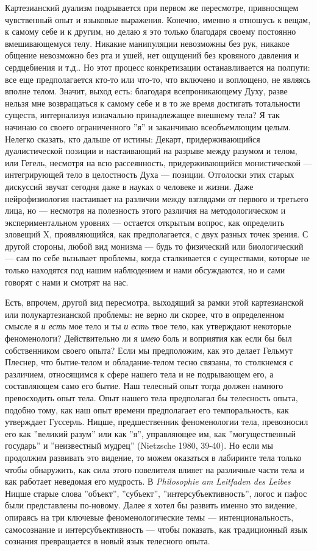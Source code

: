 \documentclass[12pt]{book}
\begin{document}
Картезианский дуализм подрывается при первом же пересмотре, привносящем чувственный опыт и языковые выражения. Конечно, именно я отношусь к вещам, к самому себе и к другим, но делаю я это только благодаря своему постоянно вмешивающемуся телу. Никакие манипуляции невозможны без рук, никакое общение невозможно без рта и ушей, нет ощущений без кровяного давления и сердцебиения и т.д.. Но этот процесс конкретизации останавливается на полпути: все еще предполагается кто-то или что-то, что включено и воплощено, не являясь вполне телом. Значит, выход есть: благодаря всепроникающему Духу, разве нельзя мне возвращаться к самому себе и в то же время достигать тотальности существ, интернализуя изначально принадлежащее внешнему тела? Я так начинаю со своего ограниченного ''я'' и заканчиваю всеобъемлющим целым. Нелегко сказать, кто дальше от истины: Декарт, придерживающийся дуалистической позиции и настаивающий на разрыве между разумом и телом, или Гегель, несмотря на всю рассеянность, придерживающийся монистической --- интегрирующей тело в целостность Духа --- позиции. Отголоски этих старых дискуссий звучат сегодня даже в науках о человеке и жизни. Даже нейрофизиология настаивает на различии между взглядами от первого и третьего лица, но --- несмотря на полезность этого различия на методологическом и экспериментальном уровнях --- остается открытым вопрос, как определить зловещий X, проявляющийся, как предполагается, с двух разных точек зрения. С другой стороны, любой вид монизма --- будь то физический или биологический --- сам по себе вызывает проблемы, когда сталкивается с существами, которые не только находятся под нашим наблюдением и нами обсуждаются, но и сами говорят с нами и смотрят на нас.

Есть, впрочем, другой вид пересмотра, выходящий за рамки этой картезианской или полукартезианской проблемы: не верно ли скорее, что в определенном смысле я \textit{и есть} мое тело и ты \textit{и есть} твое тело, как утверждают некоторые феноменологи? Действительно ли я \textit{имею} боль и воприятия как если бы был собственником своего опыта? Если мы предположим, как это делает Гельмут Плеснер, что бытие-телом и обладание-телом тесно связаны, то столкнемся с различием, относящимся к сфере нашего тела и не подрывающем его, а составляющем само его бытие. Наш телесный опыт тогда должен намного превосходить опыт тела. Опыт нашего тела предполагал бы телесность опыта, подобно тому, как наш опыт времени предполагает его темпоральность, как утверждает Гуссерль. Ницше, предшественник феноменологии тела, превозносил его как ''великий разум'' или как ''я'', управляющее им, как ''могущественный государь'' и ''неизвестный мудрец'' (Nietzsche 1980, 39-40). Но если мы продолжим развивать это видение, то можем оказаться в лабиринте тела только чтобы обнаружить, как сила этого повелителя влияет на различные части тела и как работает неведомая его мудрость. В \textit{Philosophie am Leitfaden des Leibes} Ницше старые слова ''объект'', ''субъект'', ''интерсубъективность'', логос и пафос были представлены по-новому. Далее я хотел бы развить именно это видение, опираясь на три ключевые феноменологические темы --- интенциональность, самосознание и интерсубъективность --- чтобы показать, как традиционный язык сознания превращается в новый язык телесного опыта.
\end{document}
